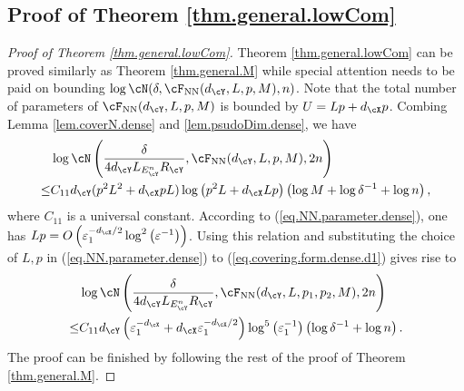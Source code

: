 \documentclass[11pt]{article} %
\begin{document}
\subsection{Proof of Theorem \ref{thm.general.lowCom}}
\label{thm.general.lowCom.proof}
\begin{proof}[Proof of Theorem \ref{thm.general.lowCom}]
Theorem \ref{thm.general.lowCom} can be proved similarly as Theorem \ref{thm.general.M} while special attention needs to be paid on bounding $\log \cN(\delta,\cF_{\rm NN}(d_{\cY},L,p,M),n)$. Note that the total number of parameters of $\cF_{\rm NN}(d_{\cY},L,p,M)$ is bounded by $U=Lp+d_{\cX}p$.
Combing Lemma \ref{lem.coverN.dense} and \ref{lem.psudoDim.dense}, we have
\begin{align}
	&\log \cN\left(\frac{\delta}{4d_{\cY}L_{E^n_{\cY}}R_{\cY}},\cF_{\rm NN}(d_{\cY},L,p,M),2n\right)\nonumber\\
	\leq &C_{11}d_{\cY}(p^2L^2+d_{\cX}pL)\log\left(p^2L+d_{\cX}Lp\right)\left(\log M+\log \delta^{-1}+\log n\right),
	\label{eq.covering.form.dense.d1}
\end{align}
where $C_{11}$ is a universal constant.
According to (\ref{eq.NN.parameter.dense}), one has $Lp=O\left( \varepsilon_1^{-d_{\cX}/2}\log^2 \left(\varepsilon^{-1}\right)\right)$. Using this relation and substituting the choice of $L,p$ in (\ref{eq.NN.parameter.dense}) to (\ref{eq.covering.form.dense.d1}) gives rise to
\begin{align}
	&\log \cN\left(\frac{\delta}{4d_{\cY}L_{E^n_{\cY}}R_{\cY}},\cF_{\rm NN}(d_{\cY},L,p_1,p_2,M),2n\right)\nonumber\\
	\leq &C_{11} d_{\cY}\left(\varepsilon_1^{-d_{\cX}}+ d_{\cX}\varepsilon_1^{-d_{\cX}/2}\right)\log^5\left(\varepsilon_1^{-1}\right)\left(\log \delta^{-1}+\log n\right).
	\label{eq.NN.coveringLog.dense.d1}
\end{align}
The proof can be finished by following the rest of the proof of Theorem \ref{thm.general.M}.
\end{proof}
\end{document}
